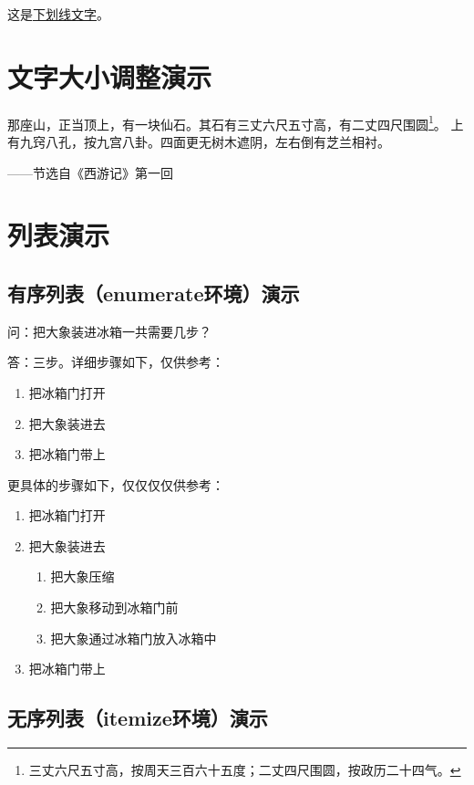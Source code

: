 \documentclass[12pt]{ctexart}   %
\begin{document}
这是\underline{下划线文字}。


\section{文字大小调整演示}

那座山，正当顶上，有{一块仙石}。其石有{三}丈{六}尺{五}寸高，有{二}丈{四}尺围圆\footnote{三丈六尺五寸高，按周天三百六十五度；二丈四尺围圆，按政历二十四气。}。
上有九窍八孔，按九宫八卦。四面更无树木遮阴，左右倒有芝兰相衬。


\begin{flushright}
    ——节选自《西游记》第一回
\end{flushright}

\section{列表演示}
\subsection{有序列表（enumerate环境）演示}

问：把大象装进冰箱一共需要几步？

答：三步。详细步骤如下，仅供参考：
\begin{enumerate}
    \item 把冰箱门打开
    \item 把大象装进去
    \item 把冰箱门带上
\end{enumerate}

更具体的步骤如下，仅仅仅仅供参考：
\begin{enumerate}
    \item 把冰箱门打开
    \item 把大象装进去
    \begin{enumerate}
        \item 把大象压缩
        \item 把大象移动到冰箱门前
        \item 把大象通过冰箱门放入冰箱中
    \end{enumerate}
    \item 把冰箱门带上
\end{enumerate}

\subsection{无序列表（itemize环境）演示}
\end{document}
